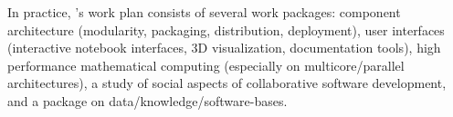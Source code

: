 




In practice, \ODK's work plan consists of several work packages: component architecture
(modularity, packaging, distribution, deployment), user interfaces (\Jupyter interactive
notebook interfaces, 3D visualization, documentation tools), high performance mathematical
computing (especially on multicore/parallel architectures), a study of social aspects of
collaborative software development, and a package on data/knowledge/software-bases.\medskip

